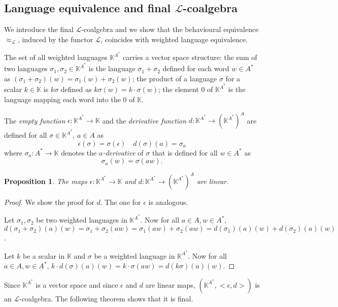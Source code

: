\documentclass[3p]{elsarticle}
\newcommand{\fL}{\mathcal{L}}    %
\newcommand{\emp}{\epsilon}           %
\newcommand{\der}{d}           %
\newcommand{\beh}[3]{\left[\!\left[ #1 \right]\!\right]^{#2}_{#3}} %
\newcommand{\K}{\mathbb{K}}            %
\newtheorem{proposition}{Proposition}
\begin{document}
\subsection{Language equivalence and final
$\fL$-coalgebra}\label{sec:langeq}
%
We introduce the final $\fL$-coalgebra and we show that the
behavioural equivalence $\approx_\fL$, induced by the functor $\fL$, coincides with weighted
language
equivalence. %

The set of all weighted languages $\K^{A^*}$ carries a vector space
structure: the sum of two languages $\sigma_1, \sigma_2\in\K^{A^*}$
is the language $\sigma_1 + \sigma_2$ defined for each word $w\in
A^*$ as $(\sigma_1 + \sigma_2)(w)=\sigma_1 (w)+ \sigma_2(w)$; the
product of a language $\sigma$ for a scalar $k\in \K$ is $k\sigma$
defined as $k\sigma(w)=k\cdot \sigma(w)$; the element $0$ of
$\K^{A^*}$ is the language mapping each word into the $0$ of $\K$.


The \emph{empty function} $\emp \colon \K^{A^*} \to \K$ and the
\emph{derivative function} $\der \colon \K^{A^*} \to (\K^{A^{*}})^A$
are defined for all $ \sigma \in \K^{A^*}$, $a\in A$ as
\[\emp(\sigma) =\sigma(\epsilon) \quad \der(\sigma)(a)=\sigma_a\]
where $\sigma_a: A^* \to \K$ denotes the \emph{$a$-derivative} of
$\sigma$ that is defined for all $w\in A^*$ as
$$\sigma_a(w)=\sigma(aw)\text{.}$$


\begin{proposition}\label{prop:linear}
The maps $\emp \colon \K^{A^*} \to \K$ and $\der \colon \K^{A^*} \to
(\K^{A^{*}})^A$ are linear.
\end{proposition}
\begin{proof}
We show the proof for $\der$. The one for $\emp$ is analogous.

Let $\sigma_1, \sigma_2$ be two weighted languages in $\K^{A^*}$.
Now for all $ a\in A, w \in A^*$,
$\der(\sigma_1+\sigma_2)(a)(w)=\sigma_1+\sigma_2(aw)=\sigma_1(aw)+\sigma_2(aw)=\der(\sigma_1)(a)(w)+\der(\sigma_2)(a)(w)$.

Let $k$ be a scalar in $\K$ and $\sigma$ be a weighted language in
$\K^{A^*}$. Now for all $ a\in A, w \in A^*$, $k \cdot
\der(\sigma)(a)(w)=k \cdot \sigma(aw)=\der(k \sigma)(a)(w)$.
\end{proof}

Since $\K^{A^*}$ is a vector space and since $\emp$ and $\der$ are
linear maps, $(\K^{A^*},<\emp,\der>)$ is an $\fL$-coalgebra. The
following theorem shows that it is final.
\end{document}

